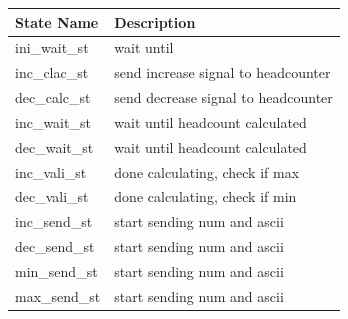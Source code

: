 \documentclass[12pt,a4 paper] {report}
\begin{document}
\begin{center}
 \begin{tabular}{| p{4cm} | p{7cm} |}
	 \hline
	 \textbf{State Name} & \textbf{Description} \\
	 \hline
	 ini\_wait\_st & wait until \\
	 \hline
	 inc\_clac\_st & send increase signal to headcounter \\
	 \hline
	 dec\_calc\_st & send decrease signal to headcounter \\
	 \hline
	 inc\_wait\_st & wait until headcount calculated \\
	 \hline
	 dec\_wait\_st & wait until headcount calculated \\
	 \hline
	 inc\_vali\_st & done calculating, check if max \\
	 \hline
	 dec\_vali\_st & done calculating, check if min \\
	 \hline
	 inc\_send\_st & start sending num and ascii \\
	 \hline
	 dec\_send\_st & start sending num and ascii \\
	 \hline
	 min\_send\_st & start sending num and ascii \\
	 \hline
	 max\_send\_st & start sending num and ascii \\
	 \hline
 \end{tabular}
\end{center}

\newpage
\end{document}
